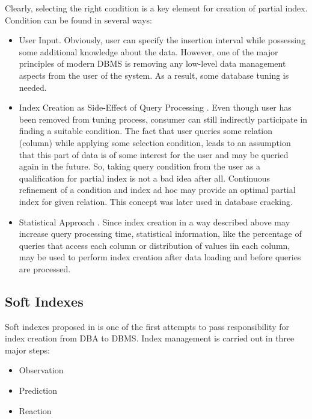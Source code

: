 \documentclass[10pt, conference, compsocconf]{IEEEtran}
\begin{document}
Clearly, selecting the right condition is a key element for creation of partial index. Condition can be found in several ways:\\
\begin{itemize}

\item{User Input}. Obviously, user can specify the insertion interval while possessing some additional knowledge about the data. However, one of the major principles of modern DBMS is removing any low-level data management aspects from the user of the system. As a result, some database tuning is needed.\\

\item{Index Creation as Side-Effect of Query Processing \cite{partial1}}. Even though user has been removed from tuning process, consumer can still indirectly participate in finding a suitable condition. The fact that user queries some relation (column) while applying some selection condition, leads to an assumption that this part of data is of some interest for the user and may be queried again in the future. So, taking query condition from the user as a qualification for partial index is not a bad idea after all. Continuous refinement of a condition and index ad hoc may provide an optimal partial index for given relation. This concept was later used in database cracking.\\

\item{Statistical Approach \cite{partial2}}. Since index creation in a way described above may increase query processing time, statistical information, like the percentage of queries that access each column or distribution of values iin each column, may be used to perform index creation after data loading and before queries are processed.
\end{itemize}

\subsection{Soft Indexes}
Soft indexes proposed in \cite{soft_indexes} is one of the first attempts to pass responsibility for index creation from DBA to DBMS. Index management is carried out in three major steps:
\begin{itemize}
\item{Observation}
\item{Prediction}
\item{Reaction}
\end{itemize}
\end{document}
